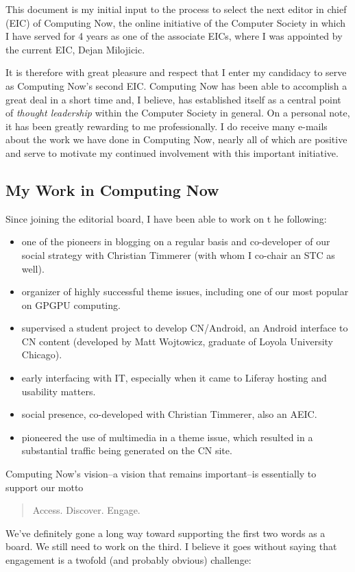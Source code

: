 \documentclass[11pt,english]{luclet}
\begin{document}
This document is my initial input to the process to select the next
editor in chief (EIC) of Computing Now, the online initiative of the
Computer Society in which I have served for 4 years as one of the
associate EICs, where I was appointed by the current EIC, Dejan
Milojicic.

It is therefore with great pleasure and respect that I enter my
candidacy to serve as Computing Now's second EIC. Computing Now has been
able to accomplish a great deal in a short time and, I believe, has
established itself as a central point of \emph{thought leadership}
within the Computer Society in general. On a personal note, it has been
greatly rewarding to me professionally. I do receive many e-mails about
the work we have done in Computing Now, nearly all of which are positive
and serve to motivate my continued involvement with this important
initiative.

\subsection{My Work in Computing Now}

Since joining the editorial board, I have been able to work on t he
following:

\begin{itemize}
\item
  one of the pioneers in blogging on a regular basis and co-developer of
  our social strategy with Christian Timmerer (with whom I co-chair an
  STC as well).
\item
  organizer of highly successful theme issues, including one of our most
  popular on GPGPU computing.
\item
  supervised a student project to develop CN/Android, an Android
  interface to CN content (developed by Matt Wojtowicz, graduate of
  Loyola University Chicago).
\item
  early interfacing with IT, especially when it came to Liferay hosting
  and usability matters.
\item
  social presence, co-developed with Christian Timmerer, also an AEIC.
\item
  pioneered the use of multimedia in a theme issue, which resulted in a
  substantial traffic being generated on the CN site.
\end{itemize}
Computing Now's vision--a vision that remains important--is essentially
to support our motto

\begin{quote}
Access. Discover. Engage.

\end{quote}
We've definitely gone a long way toward supporting the first two words
as a board. We still need to work on the third. I believe it goes
without saying that engagement is a twofold (and probably obvious)
challenge:
\end{document}
